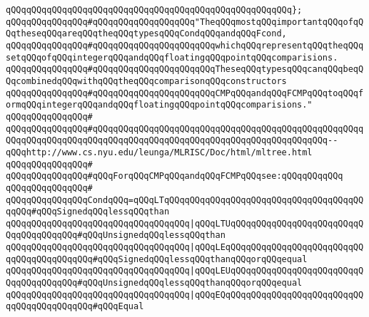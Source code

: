\verb|qQQqqQQqqQQqqQQqqQQqqQQqqQQqqQQqqQQqqQQqqQQqqQQqqQQqqQQq};|\newline
\newline
\newline
\newline
\verb|qQQqqQQqqQQqqQQq#qQQqqQQqqQQqqQQqqQQq"TheqQQqmostqQQqimportantqQQqofqQQqtheseqQQqareqQQqtheqQQqtypesqQQqCondqQQqandqQQqFcond,|\newline
\verb|qQQqqQQqqQQqqQQq#qQQqqQQqqQQqqQQqqQQqqQQqwhichqQQqrepresentqQQqtheqQQqsetqQQqofqQQqintegerqQQqandqQQqfloatingqQQqpointqQQqcomparisions.|\newline
\verb|qQQqqQQqqQQqqQQq#qQQqqQQqqQQqqQQqqQQqqQQqTheseqQQqtypesqQQqcanqQQqbeqQQqcombinedqQQqwithqQQqtheqQQqcomparisonqQQqconstructors|\newline
\verb|qQQqqQQqqQQqqQQq#qQQqqQQqqQQqqQQqqQQqqQQqCMPqQQqandqQQqFCMPqQQqtoqQQqformqQQqintegerqQQqandqQQqfloatingqQQqpointqQQqcomparisions."|\newline
\verb|qQQqqQQqqQQqqQQq#|\newline
\verb|qQQqqQQqqQQqqQQq#qQQqqQQqqQQqqQQqqQQqqQQqqQQqqQQqqQQqqQQqqQQqqQQqqQQqqQQqqQQqqQQqqQQqqQQqqQQqqQQqqQQqqQQqqQQqqQQqqQQqqQQqqQQqqQQqqQQq--qQQqhttp://www.cs.nyu.edu/leunga/MLRISC/Doc/html/mltree.html|\newline
\verb|qQQqqQQqqQQqqQQq#|\newline
\verb|qQQqqQQqqQQqqQQq#qQQqForqQQqCMPqQQqandqQQqFCMPqQQqsee:qQQqqQQq|\verb|qQQq|\newline
\verb|qQQqqQQqqQQqqQQq#|\newline
\verb|qQQqqQQqqQQqqQQqCondqQQq=qQQqLTqQQqqQQqqQQqqQQqqQQqqQQqqQQqqQQqqQQqqQQqqQQq#qQQqSignedqQQqlessqQQqthan|\newline
\verb|qQQqqQQqqQQqqQQqqQQqqQQqqQQqqQQqqQQq|\verb#|qQQqLTUqQQqqQQqqQQqqQQqqQQqqQQqqQQqqQQqqQQqqQQq#\verb|#qQQqUnsignedqQQqlessqQQqthan|\newline
\verb|qQQqqQQqqQQqqQQqqQQqqQQqqQQqqQQqqQQq|\verb#|qQQqLEqQQqqQQqqQQqqQQqqQQqqQQqqQQqqQQqqQQqqQQqqQQq#\verb|#qQQqSignedqQQqlessqQQqthanqQQqorqQQqequal|\newline
\verb|qQQqqQQqqQQqqQQqqQQqqQQqqQQqqQQqqQQq|\verb#|qQQqLEUqQQqqQQqqQQqqQQqqQQqqQQqqQQqqQQqqQQqqQQq#\verb|#qQQqUnsignedqQQqlessqQQqthanqQQqorqQQqequal|\newline
\verb|qQQqqQQqqQQqqQQqqQQqqQQqqQQqqQQqqQQq|\verb#|qQQqEQqQQqqQQqqQQqqQQqqQQqqQQqqQQqqQQqqQQqqQQqqQQq#\verb|#qQQqEqual|\newline
